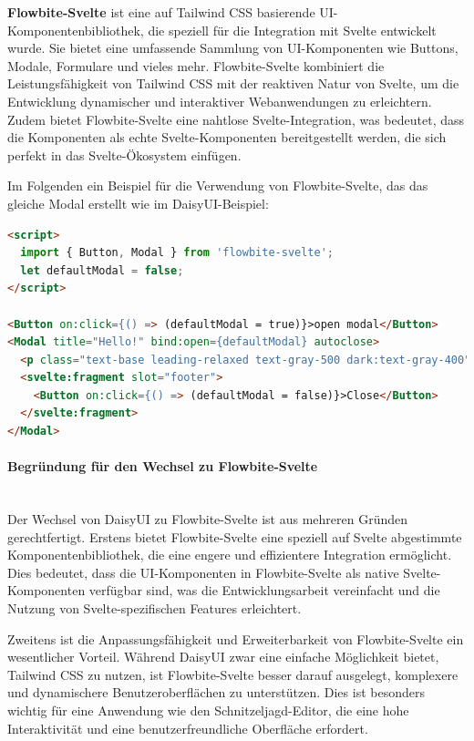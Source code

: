 \textbf{Flowbite-Svelte} ist eine auf Tailwind CSS basierende UI-Komponentenbibliothek, die speziell für die Integration mit Svelte entwickelt wurde. Sie bietet eine umfassende Sammlung von UI-Komponenten wie Buttons, Modale, Formulare und vieles mehr. Flowbite-Svelte kombiniert die Leistungsfähigkeit von Tailwind CSS mit der reaktiven Natur von Svelte, um die Entwicklung dynamischer und interaktiver Webanwendungen zu erleichtern. Zudem bietet Flowbite-Svelte eine nahtlose Svelte-Integration, was bedeutet, dass die Komponenten als echte Svelte-Komponenten bereitgestellt werden, die sich perfekt in das Svelte-Ökosystem einfügen. 

Im Folgenden ein Beispiel für die Verwendung von Flowbite-Svelte, das das gleiche Modal erstellt wie im DaisyUI-Beispiel:

\begin{lstlisting}[language=html, caption={Flowbite-Svelte Beispiel}]
<script>
  import { Button, Modal } from 'flowbite-svelte';
  let defaultModal = false;
</script>

<Button on:click={() => (defaultModal = true)}>open modal</Button>
<Modal title="Hello!" bind:open={defaultModal} autoclose>
  <p class="text-base leading-relaxed text-gray-500 dark:text-gray-400">Press ESC key or click the button below to close</p>
  <svelte:fragment slot="footer">
    <Button on:click={() => (defaultModal = false)}>Close</Button>
  </svelte:fragment>
</Modal>
\end{lstlisting}

\paragraph{Begründung für den Wechsel zu Flowbite-Svelte}\mbox{}\\
Der Wechsel von DaisyUI zu Flowbite-Svelte ist aus mehreren Gründen gerechtfertigt. Erstens bietet Flowbite-Svelte eine speziell auf Svelte abgestimmte Komponentenbibliothek, die eine engere und effizientere Integration ermöglicht. Dies bedeutet, dass die UI-Komponenten in Flowbite-Svelte als native Svelte-Komponenten verfügbar sind, was die Entwicklungsarbeit vereinfacht und die Nutzung von Svelte-spezifischen Features erleichtert.

Zweitens ist die Anpassungsfähigkeit und Erweiterbarkeit von Flowbite-Svelte ein wesentlicher Vorteil. Während DaisyUI zwar eine einfache Möglichkeit bietet, Tailwind CSS zu nutzen, ist Flowbite-Svelte besser darauf ausgelegt, komplexere und dynamischere Benutzeroberflächen zu unterstützen. Dies ist besonders wichtig für eine Anwendung wie den Schnitzeljagd-Editor, die eine hohe Interaktivität und eine benutzerfreundliche Oberfläche erfordert.

